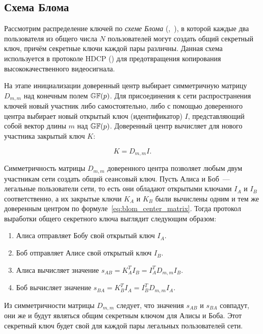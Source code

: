 \subsection{Схема Блома}

Рассмотрим распределение ключей по \emph{схеме Блома} (,~\cite{Blom:1984, Blom:1985}), в которой каждые два пользователя из общего числа $N$ пользователей могут создать общий секретный ключ, причём секретные ключи каждой пары различны. Данная схема используется в протоколе HDCP () для предотвращения копирования высококачественного видеосигнала.

На этапе инициализации доверенный центр выбирает симметричную матрицу $D_{m,m}$ над конечным полем $\mathbb{GF}(p)$. Для присоединения к сети распространения ключей новый участник либо самостоятельно, либо с помощью доверенного центра выбирает новый открытый ключ (идентификатор) $I$, представляющий собой вектор длины $m$ над $\mathbb{GF}(p)$. Доверенный центр вычисляет для нового участника закрытый ключ $K$:

\begin{equation}
	K = D_{m,m} I.
	\label{eq:blom_center_matrix}
\end{equation}

Симметричность матрицы $D_{m,m}$ доверенного центра позволяет любым двум участникам сети создать общий сеансовый ключ. Пусть Алиса и Боб~--- легальные пользователи сети, то есть они обладают открытыми ключами $I_A$ и $I_B$ соответственно, а их закрытые ключи $K_A$ и $K_B$ были вычислены одним и тем же доверенным центром по формуле~\ref{eq:blom_center_matrix}. Тогда протокол выработки общего секретного ключа выглядит следующим образом:

\begin{enumerate}
	\item Алиса отправляет Бобу свой открытый ключ $I_A$.
	\item Боб отправляет Алисе свой открытый ключ $I_B$.
	\item Алиса вычисляет значение $s_{AB} = K^T_A I_B = I^T_A D_{m,m} I_B$.
	\item Боб вычисляет значение $s_{BA} = K^T_B I_A = I^T_B D_{m,m} I_A$.
\end{enumerate}

Из симметричности матрицы $D_{m,m}$ следует, что значения $s_{AB}$ и $s_{BA}$ совпадут, они же и будут являться общим секретным ключом для Алисы и Боба. Этот секретный ключ будет свой для каждой пары легальных пользователей сети.


